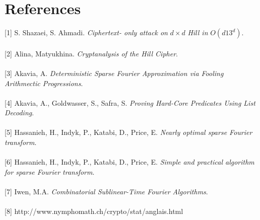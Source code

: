 \documentclass{article}
\begin{document}
\section*{References}
[1] S. Shazaei, S. Ahmadi. \textit{Ciphertext- only attack on} $d \times d$ \textit{Hill in} $O(d13^d)$.\\
\\[0pt]
[2] Alina, Matyukhina. \textit{Cryptanalysis of the Hill Cipher}.\\
\\[0pt]
[3] Akavia, A. \textit{Deterministic Sparse Fourier Approximation via Fooling Arithmectic Progressions}.\\
\\[0pt]
[4] Akavia, A., Goldwasser, S., Safra, S. \textit{Proving Hard-Core Predicates Using List Decoding}.\\
\\[0pt]
[5] Hassanieh, H., Indyk, P., Katabi, D., Price, E. \textit{Nearly optimal sparse Fourier transform}.\\
\\[0pt]
[6] Hassanieh, H., Indyk, P., Katabi, D., Price, E. \textit{Simple and practical algorithm for sparse Fourier transform}.\\
\\[0pt]
[7] Iwen, M.A. \textit{Combinatorial Sublinear-Time Fourier Algorithms}.\\
\\[0pt]
[8] http://www.nymphomath.ch/crypto/stat/anglais.html\\
\end{document}
